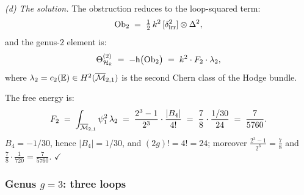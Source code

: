 \begin{computation}
\medskip\noindent\emph{(d) The solution.}
The obstruction reduces to the loop-squared term:
\begin{equation}%
\Ob_2
\;=\;
\tfrac{1}{2}\,k^2\,[\delta_{\mathrm{irr}}^2] \otimes
\Delta^2,
\end{equation}
and the genus-$2$ element is:
\begin{equation}%
\Theta^{(2)}_{\cH_k}
\;=\;
-\hCont\bigl(\Ob_2\bigr)
\;=\;
k^2 \cdot F_2 \cdot \lambda_2,
\end{equation}
where $\lambda_2 = c_2(\mathbb{E}) \in H^2(\overline{\mathcal{M}}_{2,1})$
is the second Chern class of the Hodge bundle.

The free energy is:
\begin{equation}%
F_2
\;=\;
\int_{\overline{\cM}_{2,1}} \psi_1^{2}\,\lambda_2
\;=\;
\frac{2^3 - 1}{2^3} \cdot \frac{|B_4|}{4!}
\;=\;
\frac{7}{8} \cdot \frac{1/30}{24}
\;=\;
\frac{7}{5760}.
\end{equation}
$B_4 = -1/30$, hence $|B_4| = 1/30$, and
$(2g)! = 4! = 24$; moreover
$\frac{2^3-1}{2^3} = \frac{7}{8}$ and
$\frac{7}{8} \cdot \frac{1}{720} = \frac{7}{5760}$. $\checkmark$
\end{computation}

\subsubsection{Genus $g = 3$: three loops}

